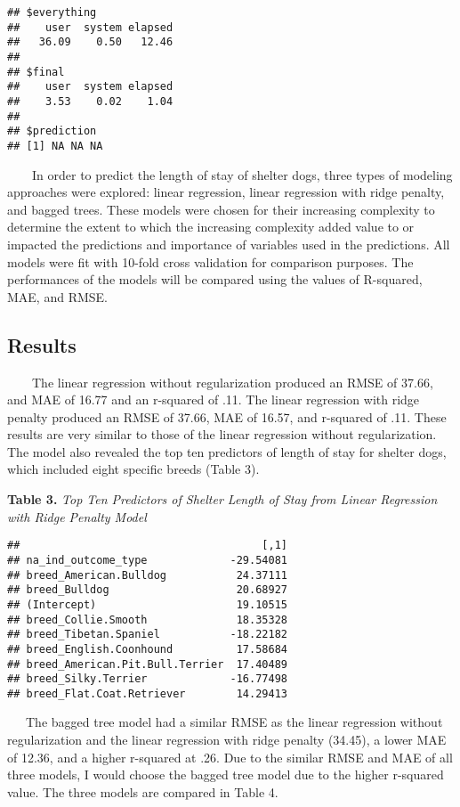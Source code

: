 \documentclass[
  11pt,
]{article}
\begin{document}
\begin{verbatim}
## $everything
##    user  system elapsed 
##   36.09    0.50   12.46 
## 
## $final
##    user  system elapsed 
##    3.53    0.02    1.04 
## 
## $prediction
## [1] NA NA NA
\end{verbatim}

~~~~In order to predict the length of stay of shelter dogs, three types
of modeling approaches were explored: linear regression, linear
regression with ridge penalty, and bagged trees. These models were
chosen for their increasing complexity to determine the extent to which
the increasing complexity added value to or impacted the predictions and
importance of variables used in the predictions. All models were fit
with 10-fold cross validation for comparison purposes. The performances
of the models will be compared using the values of R-squared, MAE, and
RMSE.

\hypertarget{results}{%
\subsection{Results}\label{results}}

~~~~The linear regression without regularization produced an RMSE of
37.66, and MAE of 16.77 and an r-squared of .11. The linear regression
with ridge penalty produced an RMSE of 37.66, MAE of 16.57, and
r-squared of .11. These results are very similar to those of the linear
regression without regularization. The model also revealed the top ten
predictors of length of stay for shelter dogs, which included eight
specific breeds (Table 3).

\textbf{Table 3.} \emph{Top Ten Predictors of Shelter Length of Stay
from Linear Regression with Ridge Penalty Model}

\begin{verbatim}
##                                      [,1]
## na_ind_outcome_type             -29.54081
## breed_American.Bulldog           24.37111
## breed_Bulldog                    20.68927
## (Intercept)                      19.10515
## breed_Collie.Smooth              18.35328
## breed_Tibetan.Spaniel           -18.22182
## breed_English.Coonhound          17.58684
## breed_American.Pit.Bull.Terrier  17.40489
## breed_Silky.Terrier             -16.77498
## breed_Flat.Coat.Retriever        14.29413
\end{verbatim}

~~~The bagged tree model had a similar RMSE as the linear regression
without regularization and the linear regression with ridge penalty
(34.45), a lower MAE of 12.36, and a higher r-squared at .26. Due to the
similar RMSE and MAE of all three models, I would choose the bagged tree
model due to the higher r-squared value. The three models are compared
in Table 4.
\end{document}
